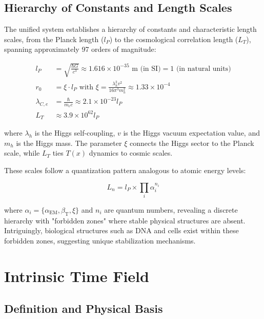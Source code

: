 \documentclass[aps,prl,twocolumn,superscriptaddress,nofootinbib]{revtex4-2}
\newcommand{\Tfield}{T(x)}
\newcommand{\alphaEM}{\alpha_{\text{EM}}}
\newcommand{\betaT}{\beta_{\text{T}}}
\begin{document}
	\subsection{Hierarchy of Constants and Length Scales}
	\label{subsec:hierarchy}
	
	The unified system establishes a hierarchy of constants and characteristic length scales, from the Planck length ($l_P$) to the cosmological correlation length ($L_T$), spanning approximately 97 orders of magnitude:
	
	\begin{equation}
		\begin{aligned}
			l_P &= \sqrt{\frac{\hbar G}{c^3}} \approx 1.616 \times 10^{-35} \text{ m (in SI)} = 1 \text{ (in natural units)} \\
			r_0 &= \xi \cdot l_P \text{ with } \xi = \frac{\lambda_h^2 v^2}{16\pi^3 m_h^2} \approx 1.33 \times 10^{-4} \\
			\lambda_{C,e} &= \frac{\hbar}{m_e c} \approx 2.1 \times 10^{-23} l_P \\
			L_T &\approx 3.9 \times 10^{62} l_P
		\end{aligned}
		\label{eq:length_scales}
	\end{equation}
	
	where $\lambda_h$ is the Higgs self-coupling, $v$ is the Higgs vacuum expectation value, and $m_h$ is the Higgs mass. The parameter $\xi$ connects the Higgs sector to the Planck scale, while $L_T$ ties $\Tfield$ dynamics to cosmic scales.
	
	These scales follow a quantization pattern analogous to atomic energy levels:
	
	\begin{equation}
		L_n = l_P \times \prod_i \alpha_i^{n_i}
		\label{eq:quantization}
	\end{equation}
	
	where $\alpha_i = \{\alphaEM, \betaT, \xi\}$ and $n_i$ are quantum numbers, revealing a discrete hierarchy with "forbidden zones" where stable physical structures are absent. Intriguingly, biological structures such as DNA and cells exist within these forbidden zones, suggesting unique stabilization mechanisms.
	
	\section{Intrinsic Time Field}
	\label{sec:time_field}
	
	\subsection{Definition and Physical Basis}
	\label{subsec:time_field_def}
	
\end{document}
